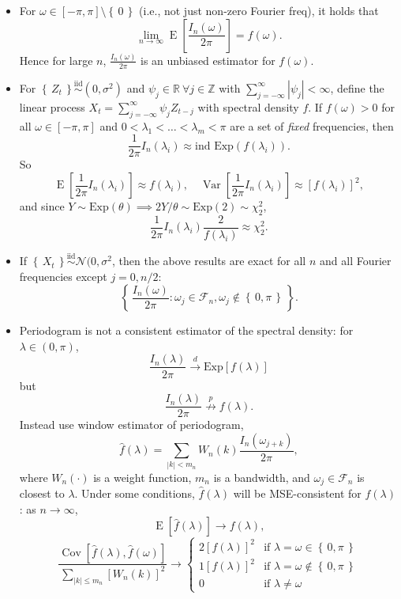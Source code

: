 \documentclass[paper=a4,fontsize=2.89mm]{scrartcl}
\DeclareMathOperator{\Var}{Var}
\DeclareMathOperator{\Cov}{Cov}
\DeclareMathOperator{\E}{E}
\newcommand{\iid}{\stackrel{\text{iid}}{\sim}}
\newcommand{\R}{\mathbb{R}}
\newcommand{\Z}{\mathbb{Z}}
\newcommand\abs[1]{\left| #1 \right|}
\newcommand\set[1]{\left\{\, #1 \,\right\}}
\begin{document}
\begin{multicols}{3}
\begin{itemize}
\item For $\omega \in [-\pi,\pi]\setminus\set{0}$ (i.e., not just non-zero Fourier freq), it holds that
$$\lim_{n\to\infty} \E\left[ \frac{I_n(\omega)}{2\pi} \right]= f(\omega).$$
Hence for large $n$, $\frac{I_n(\omega)}{2\pi}$ is an unbiased estimator for $f(\omega)$.

\item
For $\set{Z_t}\iid (0,\sigma^2)$ and $\psi_j\in\R~\forall j\in\Z$ with $\sum_{j=-\infty}^\infty\abs{\psi_j}<\infty$, define the linear process $X_t = \sum_{j=-\infty}^\infty\psi_jZ_{t-j}$ with spectral density $f$. If $f(\omega) > 0$ for all $\omega \in [-\pi,\pi]$ and $0<\lambda_1 < \dots < \lambda_m < \pi$ are a set of \emph{fixed} frequencies, then
$$\frac{1}{2\pi}I_n(\lambda_i) \approx \text{ind Exp}(f(\lambda_i)).$$
So $$\E\left[\frac{1}{2\pi}I_n(\lambda_i)\right] \approx f(\lambda_i), \quad \Var\left[\frac{1}{2\pi}I_n(\lambda_i)\right] \approx [f(\lambda_i)]^2,$$
and since $Y \sim \text{Exp}(\theta) \implies 2Y/\theta \sim \text{Exp}(2) \sim \chi^2_2$,
$$\frac{1}{2\pi}I_n(\lambda_i)\frac{2}{f(\lambda_i)} \approx \chi^2_2.$$

\item 
If $\set{X_t} \iid \mathcal{N}(0,\sigma^2$, then the above results are exact for all $n$ and  all Fourier frequencies except $j = 0, n/2$:
$$\set{\frac{I_n(\omega)}{2\pi}: \omega_j \in \mathcal{F}_n, \omega_j \not\in\set{0,\pi}}.$$

\item
Periodogram is not a consistent estimator of the spectral density: for $\lambda\in(0,\pi)$,
$$\frac{I_n(\lambda)}{2\pi} \stackrel{d}{\to} \text{Exp}[f(\lambda)]$$
but
$$\frac{I_n(\lambda)}{2\pi} \stackrel{p}{\not\to} f(\lambda).$$
Instead use window estimator of periodogram,
$$\hat{f}(\lambda) = \sum_{\abs{k}<m_n}W_n(k)\frac{I_n(\omega_{j+k})}{2\pi},$$
where $W_n(\cdot)$ is a weight function, $m_n$ is a bandwidth, and $\omega_j\in\mathcal{F}_n$ is closest to $\lambda$. Under some conditions, $\hat{f}(\lambda)$ will be MSE-consistent for $f(\lambda)$: as $n\to\infty$,
$$\E[\hat{f}(\lambda)] \to f(\lambda),$$
$$ \frac{\Cov[\hat{f}(\lambda),\hat{f}(\omega)]}{\sum_{\abs{k}\le m_n}[W_n(k)]^2} \to
\left\{ \begin{array}{ll}
2[f(\lambda)]^2 & \mbox{if $\lambda = \omega \in \set{0,\pi}$} \\
1[f(\lambda)]^2 & \mbox{if $\lambda = \omega \not\in \set{0,\pi}$} \\
0   & \mbox{if $\lambda \ne \omega$} 
       \end{array} \right.$$
\end{itemize}


\end{multicols}
\end{document}
